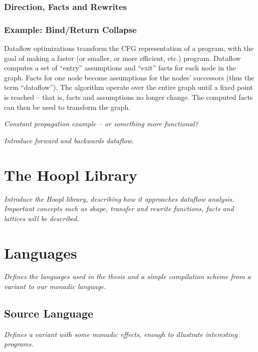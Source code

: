 \documentclass[11pt]{article}
\begin{document}
\subsubsection{Direction, Facts and Rewrites}

\subsubsection{Example: Bind/Return Collapse}

Dataflow optimizations transform the CFG representation of a program,
with the goal of making a faster (or smaller, or more efficient, etc.)
program. Dataflow computes a set of ``entry'' assumptions and ``exit''
facts for each node in the graph. Facts for one node become
assumptions for the nodes' successors (thus the term
``dataflow''). The algorithm operate over the entire graph until a
fixed point is reached -- that is, facts and assumptions no longer
change. The computed facts can then be used to transform the graph.

\emph{Constant propagation example -- or something more functional?}

\emph{Introduce forward and backwards dataflow.}




\section{The Hoopl Library}

\emph{Introduce the Hoopl library, describing how
it approaches dataflow analysis. Important concepts
such as shape, transfer and rewrite functions, facts and
lattices will be described. }

\section{Languages}

\emph{Defines the languages used in the thesis and a simple
  compilation scheme from a \lam variant to our monadic language. }

\subsection{Source Language}

\emph{Defines a \lam variant with some monadic effects, enough to
  illustrate interesting programs.}
\end{document}
